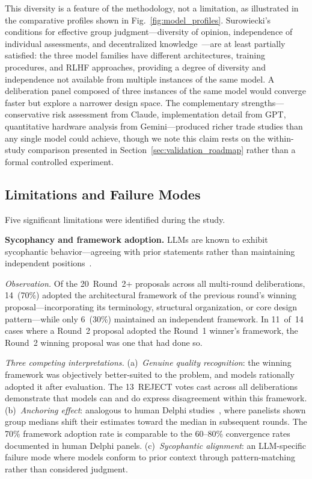 \documentclass[11pt,a4paper]{article}
\begin{document}
This diversity is a feature of the methodology, not a limitation, as illustrated in the comparative profiles shown in Fig.~\ref{fig:model_profiles}. Surowiecki's conditions for effective group judgment---diversity of opinion, independence of individual assessments, and decentralized knowledge~\cite{surowiecki2004wisdom}---are at least partially satisfied: the three model families have different architectures, training procedures, and RLHF approaches, providing a degree of diversity and independence not available from multiple instances of the same model. A deliberation panel composed of three instances of the same model would converge faster but explore a narrower design space. The complementary strengths---conservative risk assessment from Claude, implementation detail from GPT, quantitative hardware analysis from Gemini---produced richer trade studies than any single model could achieve, though we note this claim rests on the within-study comparison presented in Section~\ref{sec:validation_roadmap} rather than a formal controlled experiment.

\subsection{Limitations and Failure Modes}
\label{sec:limitations}

Five significant limitations were identified during the study.

\textbf{Sycophancy and framework adoption.} LLMs are known to exhibit sycophantic behavior---agreeing with prior statements rather than maintaining independent positions~\cite{perez2022sycophancy}.

\emph{Observation.} Of the 20~Round~2+ proposals across all multi-round deliberations, 14~(70\%) adopted the architectural framework of the previous round's winning proposal---incorporating its terminology, structural organization, or core design pattern---while only 6~(30\%) maintained an independent framework. In 11~of~14 cases where a Round~2 proposal adopted the Round~1 winner's framework, the Round~2 winning proposal was one that had done so.

\emph{Three competing interpretations.} (a)~\emph{Genuine quality recognition}: the winning framework was objectively better-suited to the problem, and models rationally adopted it after evaluation. The 13~REJECT votes cast across all deliberations demonstrate that models can and do express disagreement within this framework. (b)~\emph{Anchoring effect}: analogous to human Delphi studies~\cite{linstone1975delphi}, where panelists shown group medians shift their estimates toward the median in subsequent rounds. The 70\% framework adoption rate is comparable to the 60--80\% convergence rates documented in human Delphi panels. (c)~\emph{Sycophantic alignment}: an LLM-specific failure mode where models conform to prior context through pattern-matching rather than considered judgment.
\end{document}
